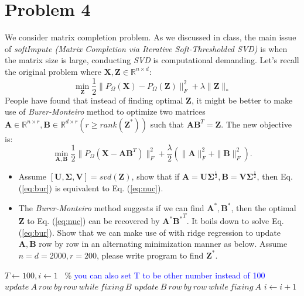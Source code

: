 \documentclass[11pt]{article}
\newcommand{\mtx}[1]{\mathbf{#1}}
\def \mA {\mtx{A}}
\def \mB {\mtx{B}}
\def \mU {\mtx{U}}
\def \mV {\mtx{V}}
\def \mSigma {\mtx{\Sigma}}
\def \mX {\mtx{X}}
\def \mZ {\mtx{Z}}
\begin{document}
	\section{Problem 4}
	We consider matrix completion problem. As we discussed in class, the main issue of \textit{softImpute (Matrix Completion via Iterative Soft-Thresholded SVD)} is 
	when the matrix size is large, conducting \textit{SVD} is computational demanding. Let's recall the original problem where 
	$\mX, \mZ \in\mathbb{R}^{n\times d}$: 
	\begin{equation}\label{eq:nuc}
	\min\limits_{\mZ}\frac{1}{2}\|P_\Omega(\mX)-P_\Omega(\mZ)\|_F^2+\lambda \|\mZ\|_*
	\end{equation} 
People have found that instead of finding optimal $\mZ$, it might be better to make use of \textit{Burer-Monteiro} method to optimize two matrices $\mA \in\mathbb{R}^{n\times r}, \mB\in\mathbb{R}^{d\times r} (r\ge rank(\mZ^*))$ such that $\mA\mB^T=\mZ$. The new objective is:
	\begin{equation}\label{eq:bur}
	\min\limits_{\mA,\mB}\frac{1}{2}\|P_\Omega(\mX-\mA\mB^T)\|_F^2+\frac{\lambda}{2}(\|\mA\|_F^2+\|\mB\|^2_F).
\end{equation} 
\begin{itemize}
	\item Assume $[\mU,\mSigma,\mV]=svd(\mZ)$, show that if $\mA=\mU\mSigma^\frac{1}{2}, \mB=\mV\mSigma^\frac{1}{2}$, then Eq. (\ref{eq:bur}) is equivalent to Eq. (\ref{eq:nuc}).
	\item The \textit{Burer-Monteiro} method suggests if we can find  $\mA^*,\mB^*$, then the optimal $\mZ$ to Eq. (\ref{eq:nuc}) can be recovered by $\mA^*{\mB^*}^T$. It boils down to solve Eq. (\ref{eq:bur}). Show that we can make use of  with ridge regression to update $\mA, \mB$ row by row in an alternating minimization manner as below. Assume $n=d=2000, r=200$, please write program to find $\mZ^*$.
\end{itemize}
\begin{algorithmic}
	\State $T \gets 100, i\gets 1$ \ \% \textcolor{blue}{you can also set T to be other number instead of 100}
	\State $update \ A \ row \ by \ row \ while \ fixing \ B$
	\State $update \ B \ row \ by \ row \ while \ fixing \ A$
	\State $i \gets i+1$
	\EndIf 
\end{algorithmic}
\end{document}
